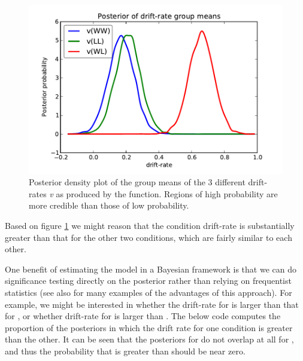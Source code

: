 \documentclass[letterpaper,10pt,english]{article}
\begin{document}
\begin{figure}
\includegraphics[scale=.7]{fig4.pdf}
\caption{Posterior density plot of the group means of the 3 different
drift-rates \emph{v} as produced by the
 function. Regions of high
probability are more credible than those of low probability.}
\label{fig.post_drift}
\end{figure}
Based on figure \ref{fig.post_drift} we might reason that the  condition drift-rate is substantially greater than that for the other two conditions, which are fairly similar to each other.

One benefit of estimating the model in a Bayesian framework is that we
can do significance testing directly on the posterior rather than
relying on frequentist statistics \citep{Lindley65} (see also
\citet{Kruschke10} for many examples of the advantages of this
approach). For example, we might be interested in whether the
drift-rate for  is larger than that for , or whether
drift-rate for  is larger than . The below code
computes the proportion of the posteriors in which the drift rate for
one condition is greater than the other. It can be seen that the
posteriors for  do not overlap at all for , and thus
the probability that  is greater than  should be
near zero.
\end{document}
